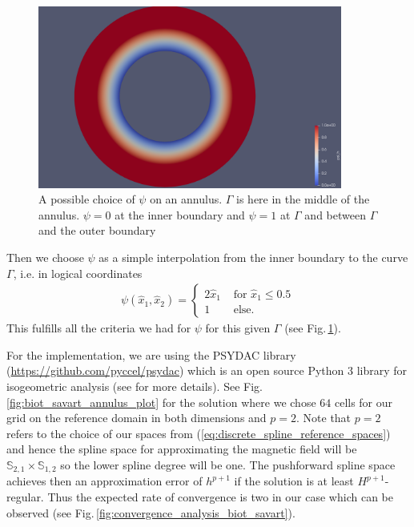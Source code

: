\documentclass[../master_thesis.tex]{subfiles}
\begin{document}
\begin{figure}
    \centering
    \includegraphics[width=10cm]{plot_files/manufactured_inner_curve/psi_h.png}
    \caption{A possible choice of $\psi$ on an annulus. $\Gamma$ is here in the 
    middle of the annulus. $\psi = 0$ at the inner boundary and $\psi=1$ 
    at $\Gamma$ and between $\Gamma$ and the outer boundary}
    \label{fig:psi_annulus}
\end{figure}

Then we choose $\psi$ as a simple interpolation from the inner boundary to 
the curve $\Gamma$, i.e. in logical coordinates 
\begin{align}
    \psi(\hat{x}_1,\hat{x}_2) = \begin{cases}
        2 \hat{x}_1 & \text{ for $\hat{x}_1 \leq 0.5$} 
        \\ 1 & \text{ else}.
    \end{cases}\label{eq:linear_interpolation_psi}
\end{align}This fulfills all the criteria we had for $\psi$ for this given $\Gamma$ 
(see Fig.\,\ref{fig:psi_annulus}). 

For the implementation, we are using the PSYDAC library (\url{https://github.com/pyccel/psydac}) 
which is an open source 
Python 3 library 
for isogeometric analysis (see \cite{psydac_paper} for more details).
See Fig.\,\ref{fig:biot_savart_annulus_plot} for the solution where 
we chose $64$ cells for our grid on the reference domain in both dimensions and $p=2$. Note 
that $p=2$ refers to the choice of our spaces from
(\ref{eq:discrete_spline_reference_spaces}) and hence the spline space for approximating 
the magnetic field will be $\mathbb{S}_{2,1} \times \mathbb{S}_{1,2}$ 
so the lower spline degree will be one. 
The pushforward spline space achieves then an approximation error 
of $h^{p+1}$ \cite[Ch.4, (4.48)]{splines_and_pdes} if the solution is at least 
$H^{p+1}$-regular.
Thus the expected rate of 
convergence is two in our case which can be observed 
(see Fig.\,\ref{fig:convergence_analysis_biot_savart}).
\end{document}
